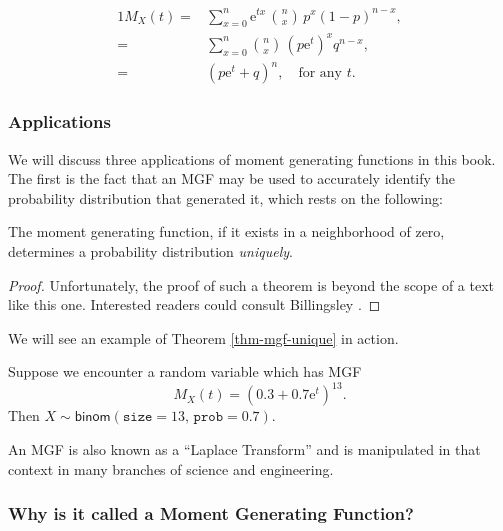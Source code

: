 \documentclass[captions=tableheading]{scrbook}
\begin{document}
\begin{alignat*}{1}
M_{X}(t)= & \sum_{x=0}^{n}\mathrm{e}^{tx}\,{n \choose x}\, p^{x}(1-p)^{n-x},\\
= & \sum_{x=0}^{n}{n \choose x}\,(p\mathrm{e}^{t})^{x}q^{n-x},\\
= & (p\mathrm{e}^{t}+q)^{n},\quad\mbox{for any $t$.}
\end{alignat*}
\subsubsection{Applications}
\label{sec-5-4-2-1}


We will discuss three applications of moment generating functions in this book. The first is the fact that an MGF may be used to accurately identify the probability distribution that generated it, which rests on the following:

\begin{thm}
The moment generating function, if it exists in a neighborhood of zero, determines a probability distribution \emph{uniquely}. 
\end{thm}

\begin{proof}
Unfortunately, the proof of such a theorem is beyond the scope of a text like this one. Interested readers could consult Billingsley \cite{Billingsley1995}.
\end{proof}


We will see an example of Theorem \ref{thm-mgf-unique} in action.

\begin{example}
Suppose we encounter a random variable which has MGF
\[
M_{X}(t)=(0.3+0.7\mathrm{e}^{t})^{13}.
\]
Then \(X\sim\mathsf{binom}(\mathtt{size}=13,\,\mathtt{prob}=0.7)\).
\end{example}

An MGF is also known as a ``Laplace Transform'' and is manipulated in that context in many branches of science and engineering.
\subsubsection{Why is it called a Moment Generating Function?}
\label{sec-5-4-2-2}
\end{document}
